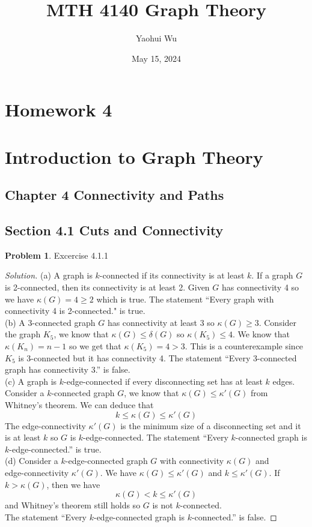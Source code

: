 \documentclass[12pt]{article}
\title{MTH 4140 Graph Theory}
\author{Yaohui Wu}
\date{May 15, 2024}
\theoremstyle{definition}
\newtheorem{problem}{Problem}
\newenvironment*{solution}{\begin{proof}[Solution]}{\end{proof}}
\begin{document}
\maketitle
\section*{Homework 4}
\section*{Introduction to Graph Theory}

\subsection*{Chapter 4 Connectivity and Paths}
\subsection*{Section 4.1 Cuts and Connectivity}
\begin{problem}
    Excercise 4.1.1
\end{problem}
\begin{solution}
    (a) A graph is \(k\)-connected if its connectivity is at least \(k\).
    If a graph \(G\) is 2-connected, then its connectivity is at least 2.
    Given \(G\) has connectivity 4 so we have \(\kappa(G)=4\geq2\) which is
    true.
    The statement ``Every graph with connectivity 4 is 2-connected." is
    true. \\
    (b) A 3-connected graph \(G\) has connectivity at least 3 so
    \(\kappa(G)\geq3\).
    Consider the graph \(K_5\), we know that \(\kappa(G)\leq\delta(G)\) so
    \(\kappa(K_5)\leq4\).
    We know that \(\kappa(K_n)=n-1\) so we get that \(\kappa(K_5)=4>3\).
    This is a counterexample since \(K_5\) is 3-connected but it has
    connectivity 4.
    The statement ``Every 3-connected graph has connectivity 3.'' is false. \\
    (c) A graph is \(k\)-edge-connected if every disconnecting set has at
    least \(k\) edges.
    Consider a \(k\)-connected graph \(G\), we know that
    \(\kappa(G)\leq\kappa'(G)\) from Whitney's theorem.
    We can deduce that \[k \leq \kappa(G) \leq \kappa'(G) \]
    The edge-connectivity \(\kappa'(G)\) is the minimum size of a
    disconnecting set and it is at least \(k\) so \(G\) is
    \(k\)-edge-connected.
    The statement ``Every \(k\)-connected graph is \(k\)-edge-connected.'' is
    true. \\
    (d) Consider a \(k\)-edge-connected graph \(G\) with connectivity
    \(\kappa(G)\) and \\ edge-connectivity \(\kappa'(G)\).
    We have \(\kappa(G)\leq\kappa'(G)\) and \(k\leq\kappa'(G)\).
    If \(k>\kappa(G)\), then we have \[\kappa(G)<k\leq\kappa'(G)\] and
    Whitney's theorem still holds so \(G\) is not \(k\)-connected. \\
    The statement ``Every \(k\)-edge-connected graph is \(k\)-connected.'' is
    false.
\end{solution}
\end{document}
